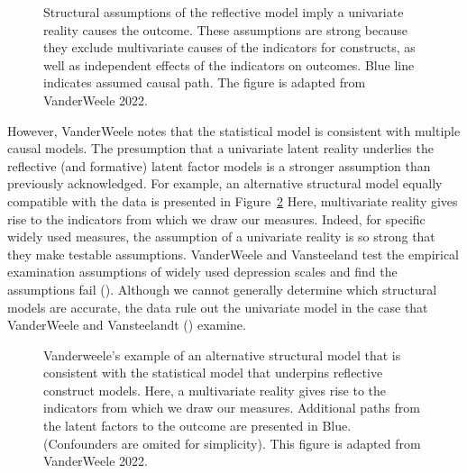 \documentclass[
  singlecolumn,
  9pt]{article}
\begin{document}
\begin{figure}


\caption{\label{fig-structural-assumptions-reflective-model}Structural
assumptions of the reflective model imply a univariate reality causes
the outcome. These assumptions are strong because they exclude
multivariate causes of the indicators for constructs, as well as
independent effects of the indicators on outcomes. Blue line indicates
assumed causal path. The figure is adapted from VanderWeele 2022.}

\end{figure}%

However, VanderWeele notes that the statistical model is consistent with
multiple causal models. The presumption that a univariate latent reality
underlies the reflective (and formative) latent factor models is a
stronger assumption than previously acknowledged. For example, an
alternative structural model equally compatible with the data is
presented in Figure~\ref{fig-dag-multivariate-reality-again} Here,
multivariate reality gives rise to the indicators from which we draw our
measures. Indeed, for specific widely used measures, the assumption of a
univariate reality is so strong that they make testable assumptions.
VanderWeele and Vansteeland test the empirical examination assumptions
of widely used depression scales and find the assumptions fail
().
Although we cannot generally determine which structural models are
accurate, the data rule out the univariate model in the case that
VanderWeele and Vansteelandt ()
examine.

\begin{figure}


\caption{\label{fig-dag-multivariate-reality-again}Vanderweele's example
of an alternative structural model that is consistent with the
statistical model that underpins reflective construct models. Here, a
multivariate reality gives rise to the indicators from which we draw our
measures. Additional paths from the latent factors to the outcome are
presented in Blue. (Confounders are omited for simplicity). This figure
is adapted from VanderWeele 2022.}

\end{figure}%
\end{document}
